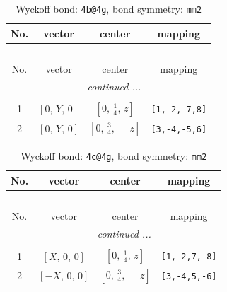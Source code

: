 \documentclass[fleqn,8pt]{jsarticle}
\begin{document}
\renewcommand{\arraystretch}{1.2}
\begin{longtable}{cccc}
\caption{Wyckoff bond: {\tt 4b@4g}, bond symmetry: {\tt mm2}}
 \\
 \hline \hline
No. & vector & center & mapping \\ \hline \endfirsthead

\multicolumn{3}{l}{\tablename\ \thetable{}} \\
 \hline \hline
No. & vector & center & mapping \\ \hline \endhead

 \hline \hline
\multicolumn{3}{r}{\footnotesize\it continued ...} \\ \endfoot

 \hline \hline
\multicolumn{3}{r}{} \\ \endlastfoot

1 & $\left[ 0,\, Y,\, 0 \right]$ & $\left[ 0,\, \frac{1}{4},\, z \right]$ & {\tt [1,-2,-7,8]} \\ \hline
2 & $\left[ 0,\, Y,\, 0 \right]$ & $\left[ 0,\, \frac{3}{4},\, - z \right]$ & {\tt [3,-4,-5,6]} \\
\end{longtable}
\renewcommand{\arraystretch}{1.2}
\begin{longtable}{cccc}
\caption{Wyckoff bond: {\tt 4c@4g}, bond symmetry: {\tt mm2}}
 \\
 \hline \hline
No. & vector & center & mapping \\ \hline \endfirsthead

\multicolumn{3}{l}{\tablename\ \thetable{}} \\
 \hline \hline
No. & vector & center & mapping \\ \hline \endhead

 \hline \hline
\multicolumn{3}{r}{\footnotesize\it continued ...} \\ \endfoot

 \hline \hline
\multicolumn{3}{r}{} \\ \endlastfoot

1 & $\left[ X,\, 0,\, 0 \right]$ & $\left[ 0,\, \frac{1}{4},\, z \right]$ & {\tt [1,-2,7,-8]} \\ \hline
2 & $\left[ - X,\, 0,\, 0 \right]$ & $\left[ 0,\, \frac{3}{4},\, - z \right]$ & {\tt [3,-4,5,-6]} \\
\end{longtable}
\renewcommand{\arraystretch}{1.2}
\end{document}
